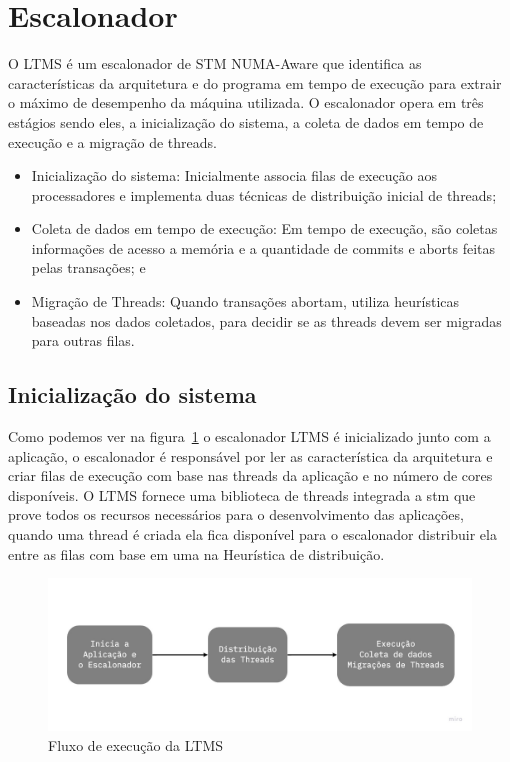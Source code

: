 \documentclass[diss,capa]{texufpel}
\begin{document}
\section{\textbf{Escalonador}}

O LTMS é um escalonador de STM NUMA-Aware que identifica as características da arquitetura e do programa em tempo de execução para extrair o máximo de desempenho da máquina utilizada. O escalonador opera em três estágios sendo eles, a inicialização do sistema, a coleta de dados em tempo de execução e a migração de threads.

\begin{itemize}
  \item Inicialização do sistema: Inicialmente associa filas de execução aos processadores e implementa duas técnicas de distribuição inicial de threads;
  \item Coleta de dados em tempo de execução: Em tempo de execução, são coletas informações de acesso a memória e a quantidade de commits e aborts feitas pelas transações; e
  \item Migração de Threads: Quando transações abortam, utiliza heurísticas baseadas nos dados coletados, para decidir se as threads devem ser migradas para outras filas.
\end{itemize}


\subsection{Inicialização do sistema}

Como podemos ver na figura~\ref{ltms_generic} o escalonador LTMS é inicializado junto com a aplicação, o escalonador é responsável por ler as característica da arquitetura e criar filas de execução com base nas threads da aplicação e no número de cores disponíveis. O LTMS fornece uma biblioteca de threads integrada a stm que prove todos os recursos necessários para o desenvolvimento das aplicações, quando uma thread é criada ela fica disponível para o escalonador distribuir ela entre as filas com base em uma na Heurística de distribuição.

\begin{figure}[htbp]
  \centering \includegraphics[scale=.25]{images/ltms_generic}
\caption{Fluxo de execução da LTMS} 
\label{ltms_generic}
\end{figure}
\end{document}
